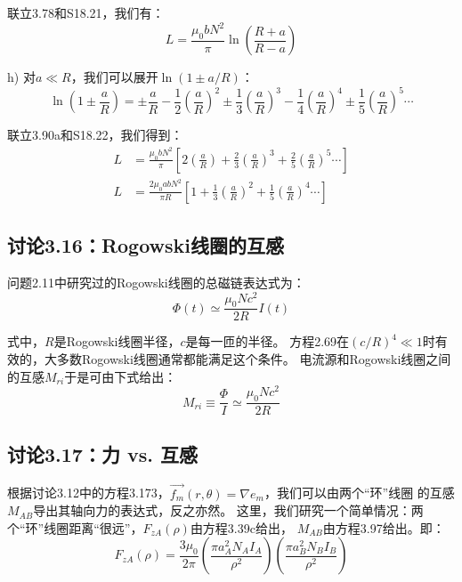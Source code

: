 联立3.78和S18.21，我们有：
 \begin{equation}%
L=\frac{\mu_0bN^2}{\pi}\ln\left(\frac{R+a}{R-a}\right)
\end{equation}

h) 对$a\ll R$，我们可以展开$\ln(1\pm a/R)$：
 \begin{equation}%
\ln(1\pm\frac{a}{R})=\pm\frac{a}{R}-\frac{1}{2}(\frac{a}{R})^2\pm\frac{1}{3}(\frac{a}{R})^3-\frac{1}{4}(\frac{a}{R})^4\pm\frac{1}{5}(\frac{a}{R})^5\cdots
\end{equation}

联立3.90a和S18.22，我们得到：
 \begin{eqnarray}%
L&=\frac{\mu_0bN^2}{\pi}\left[2(\frac{a}{R})+\frac{2}{3}(\frac{a}{R})^3+\frac{2}{5}(\frac{a}{R})^5\cdots\right]\\
L&=\frac{2\mu_0abN^2}{\pi R}\left[1+\frac{1}{3}(\frac{a}{R})^2+\frac{1}{5}(\frac{a}{R})^4\cdots\right]
\end{eqnarray}

\newpage



\subsection{讨论3.16：Rogowski线圈的互感}
问题2.11中研究过的Rogowski线圈的总磁链表达式为：
 \begin{equation}%
\Phi(t)\simeq\frac{\mu_0Nc^2}{2R}I(t)
\end{equation}

式中，$R$是Rogowski线圈半径，$c$是每一匝的半径。
方程2.69在$(c/R)^4\ll 1$时有效的，大多数Rogowski线圈通常都能满足这个条件。
电流源和Rogowski线圈之间的互感$M_{ri}$于是可由下式给出：
\begin{equation}%
M_{ri}\equiv\frac{\Phi}{I}\simeq\frac{\mu_0Nc^2}{2R}
\end{equation}

\newpage



\subsection{讨论3.17：力 vs. 互感}
根据讨论3.12中的方程3.173，$\vec{f_m}(r,\theta)=\nabla e_m$，我们可以由两个“环”线圈
的互感$M_{AB}$导出其轴向力的表达式，反之亦然。
这里，我们研究一个简单情况：两个“环”线圈距离“很远”，$F_{zA}(\rho)$由方程3.39c给出，
$M_{AB}$由方程3.97给出。即：
 \begin{equation}%
F_{zA}(\rho)=\frac{3\mu_0}{2\pi}\left(\frac{\pi a_{A}^{2}N_AI_A}{\rho^2}\right)\left(\frac{\pi a_{B}^{2}N_BI_B}{\rho^2}\right)
\end{equation}

